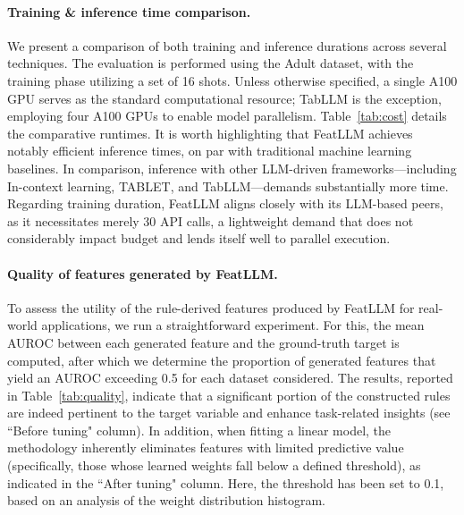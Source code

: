 \vspace*{-0.12in}
\paragraph{Training \& inference time comparison.} We present a comparison of both training and inference durations across several techniques. The evaluation is performed using the Adult dataset, with the training phase utilizing a set of 16 shots. Unless otherwise specified, a single A100 GPU serves as the standard computational resource; TabLLM is the exception, employing four A100 GPUs to enable model parallelism. Table~\ref{tab:cost} details the comparative runtimes. It is worth highlighting that \textsf{FeatLLM} achieves notably efficient inference times, on par with traditional machine learning baselines. In comparison, inference with other LLM-driven frameworks—including In-context learning, TABLET, and TabLLM—demands substantially more time. Regarding training duration, \textsf{FeatLLM} aligns closely with its LLM-based peers, as it necessitates merely 30 API calls, a lightweight demand that does not considerably impact budget and lends itself well to parallel execution.

\vspace*{-0.12in}
\paragraph{Quality of features generated by \textsf{FeatLLM}.}
To assess the utility of the rule-derived features produced by \textsf{FeatLLM} for real-world applications, we run a straightforward experiment. For this, the mean AUROC between each generated feature and the ground-truth target is computed, after which we determine the proportion of generated features that yield an AUROC exceeding 0.5 for each dataset considered. The results, reported in Table~\ref{tab:quality}, indicate that a significant portion of the constructed rules are indeed pertinent to the target variable and enhance task-related insights (see ``Before tuning" column). In addition, when fitting a linear model, the methodology inherently eliminates features with limited predictive value (specifically, those whose learned weights fall below a defined threshold), as indicated in the ``After tuning" column. Here, the threshold has been set to 0.1, based on an analysis of the weight distribution histogram.

\vspace*{-0.12in}
